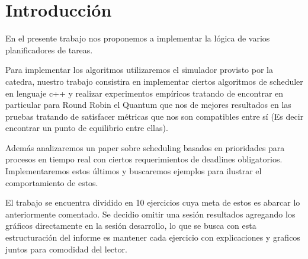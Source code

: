 \section{Introducción}

En el presente trabajo nos proponemos a implementar la lógica de varios planificadores de tareas.

Para implementar los algoritmos utilizaremos el simulador provisto por la catedra, nuestro trabajo consistira en implementar ciertos algoritmos de scheduler en lenguaje c++ y realizar experimentos empíricos tratando de encontrar en particular para Round Robin el Quantum que nos de mejores resultados en las pruebas tratando de satisfacer métricas que nos son compatibles entre sí (Es decir encontrar un punto de equilibrio entre ellas).

Además analizaremos un paper sobre scheduling basados en prioridades para procesos en tiempo real con ciertos requerimientos de deadlines obligatorios. Implementaremos estos últimos y buscaremos ejemplos para ilustrar el comportamiento de estos.

El trabajo se encuentra dividido en 10 ejercicios cuya meta de estos es abarcar lo anteriormente comentado. Se decidio omitir una sesión resultados agregando los gráficos directamente en la sesión desarrollo, lo que se busca con esta estructuración del informe es mantener cada ejercicio con explicaciones y graficos juntos para comodidad del lector.


